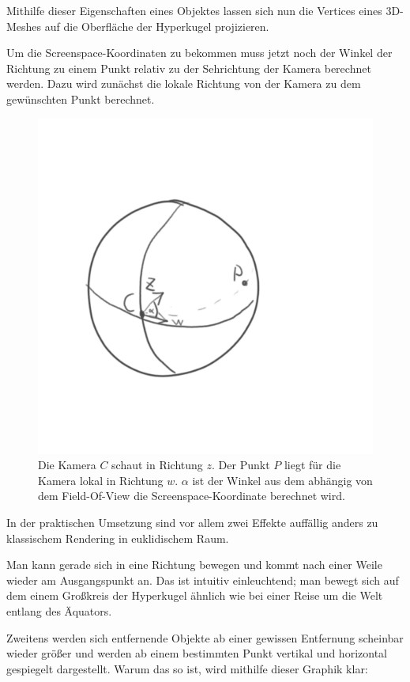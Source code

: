 \documentclass[11pt]{article}
\begin{document}
    Mithilfe dieser Eigenschaften eines Objektes lassen sich nun die Vertices eines 3D-Meshes auf die Oberfläche der Hyperkugel
    projizieren.

    Um die Screenspace-Koordinaten zu bekommen muss jetzt noch der Winkel der Richtung zu einem Punkt relativ zu der
    Sehrichtung der Kamera berechnet werden.
    Dazu wird zunächst die lokale Richtung von der Kamera zu dem gewünschten Punkt berechnet.

    \begin{figure}[H]
        \includegraphics[width=0.8\linewidth]{localDirectionalVektor.png}
        \caption{Die Kamera $C$ schaut in Richtung $z$. Der Punkt $P$ liegt für die Kamera lokal in Richtung $w$.
        $\alpha$ ist der Winkel aus dem abhängig von dem Field-Of-View die Screenspace-Koordinate berechnet wird.}
        \label{fig:localDirectionalVektor}
    \end{figure}

    In der praktischen Umsetzung sind vor allem zwei Effekte auffällig anders zu klassischem Rendering in euklidischem Raum.

    Man kann gerade sich in eine Richtung bewegen und kommt nach einer Weile wieder am Ausgangspunkt an.
    Das ist intuitiv einleuchtend;
    man bewegt sich auf dem einem Großkreis der Hyperkugel ähnlich wie bei einer Reise um die Welt entlang des
    Äquators.

    Zweitens werden sich entfernende Objekte ab einer gewissen Entfernung scheinbar wieder größer und werden ab einem bestimmten
    Punkt vertikal und horizontal gespiegelt dargestellt.
    Warum das so ist, wird mithilfe dieser Graphik klar:
\end{document}
